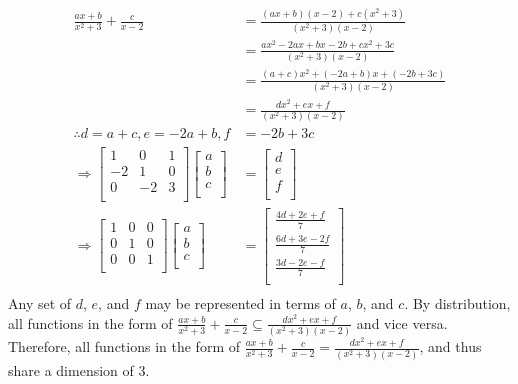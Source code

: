 \documentclass[10pt]{article}
\begin{document}
{{		\begin{align}
			\frac{ax+b}{x^2+3}+\frac{c}{x-2} &= \frac{(ax+b)(x-2)+c(x^2+3)}{(x^2+3)(x-2)} \\
			&= \frac{ax^2-2ax+bx-2b+cx^2+3c}{(x^2+3)(x-2)} \\
			&= \frac{(a+c)x^2+(-2a+b)x+(-2b+3c)}{(x^2+3)(x-2)} \\
			&= \frac{dx^2+ex+f}{(x^2+3)(x-2)} \\
			\therefore d = a+c, e = -2a+b, f &= -2b+3c \\
			\Rightarrow 
			\begin{bmatrix}
				1 & 0 & 1 \\
				-2 & 1 & 0 \\
				0 & -2 & 3 \\
			\end{bmatrix}
			\begin{bmatrix}
				a \\
				b \\
				c \\
			\end{bmatrix}
			&=
			\begin{bmatrix}
				d \\
				e \\
				f \\
			\end{bmatrix} \\
			\Rightarrow
			\begin{bmatrix}
				1 & 0 & 0 \\
				0 & 1 & 0 \\
				0 & 0 & 1 \\
			\end{bmatrix}
			\begin{bmatrix}
				a \\
				b \\
				c \\
			\end{bmatrix}
			&=
			\begin{bmatrix}
				\frac{4d + 2e + f}{7} \\
				\frac{6d + 3e - 2f}{7} \\
				\frac{3d - 2e - f}{7} \\
			\end{bmatrix} \\
		\end{align}
  		Any set of $d$, $e$, and $f$ may be represented in terms of $a$, $b$, and $c$. By distribution, all functions in the form of $\frac{ax + b}{x^{2}+3}+\frac{c}{x-2} \subseteq \frac{dx^2+ex+f}{(x^2+3)(x-2)}$ and vice versa. Therefore, all functions in the form of $\frac{ax + b}{x^{2}+3}+\frac{c}{x-2} = \frac{dx^2+ex+f}{(x^2+3)(x-2)}$, and thus share a dimension of 3.
	}
}
\end{document}
